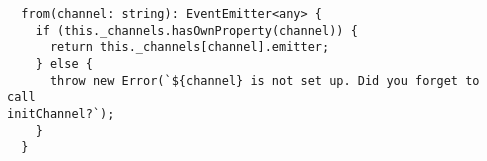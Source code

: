 \begin{verbatim}
  from(channel: string): EventEmitter<any> {
    if (this._channels.hasOwnProperty(channel)) {
      return this._channels[channel].emitter;
    } else {
      throw new Error(`${channel} is not set up. Did you forget to call
initChannel?`);
    }
  }
\end{verbatim}
